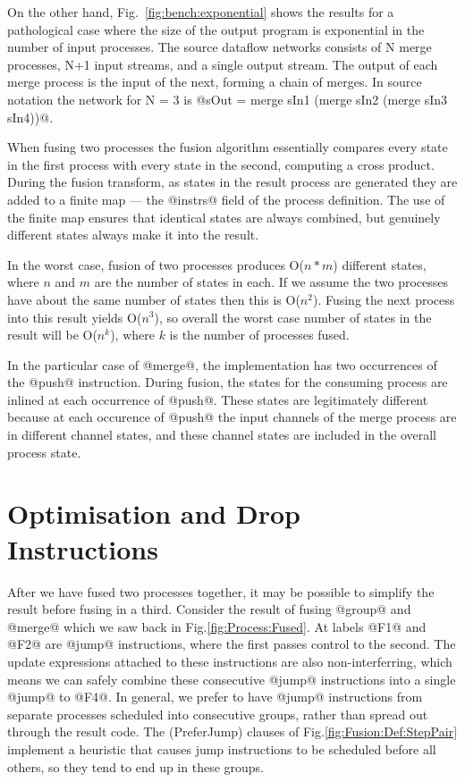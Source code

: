 On the other hand, Fig.~\ref{fig:bench:exponential} shows the results for a pathological case where the size of the output program is exponential in the number of input processes. The source dataflow networks consists of N merge processes, N+1 input streams, and a single output stream. The output of each merge process is the input of the next, forming a chain of merges. In source notation the network for N = 3 is @sOut = merge sIn1 (merge sIn2 (merge sIn3 sIn4))@.

When fusing two processes the fusion algorithm essentially compares every state in the first process with every state in the second, computing a cross product. During the fusion transform, as states in the result process are generated they are added to a finite map --- the @instrs@ field of the process definition. The use of the finite map ensures that identical states are always combined, but genuinely different states always make it into the result. 

In the worst case, fusion of two processes produces O($n*m$) different states, where $n$ and $m$ are the number of states in each. If we assume the two processes have about the same number of states then this is O($n^2$). Fusing the next process into this result yields O($n^3$), so overall the worst case number of states in the result will be O($n^k$), where $k$ is the number of processes fused. 

In the particular case of @merge@, the implementation has two occurrences of the @push@ instruction. During fusion, the states for the consuming process are inlined at each occurrence of @push@. These states are legitimately different because at each occurence of @push@ the input channels of the merge process are in different channel states, and these channel states are included in the overall process state.


\section{Optimisation and Drop Instructions}
\label{s:Optimisation}
After we have fused two processes together, it may be possible to simplify the result before fusing in a third. Consider the result of fusing @group@ and @merge@ which we saw back in Fig.\ref{fig:Process:Fused}. At labels @F1@ and @F2@ are @jump@ instructions, where the first passes control to the second. The update expressions attached to these instructions are also non-interferring, which means we can safely combine these consecutive @jump@ instructions into a single @jump@ to @F4@. In general, we prefer to have @jump@ instructions from separate processes scheduled into consecutive groups, rather than spread out through the result code. The (PreferJump) clauses of Fig.\ref{fig:Fusion:Def:StepPair} implement a heuristic that causes jump instructions to be scheduled before all others, so they tend to end up in these groups.

